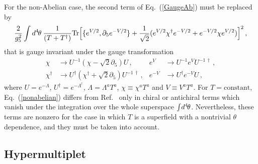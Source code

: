 \documentclass[a4paper,12pt]{article}
\begin{document}
For the non-Abelian case, the second term of Eq.~(\ref{GaugeAb}) must be
replaced by
\begin{equation}
   \frac{2}{g^2_5} \int d^4\mspace{-2mu}\theta\: 
\frac{1}{(T+ T^{\dag})} {\rm Tr} \Bigl[
        \{e^{V/2}, \partial_5 e^{-V/2}\} + \frac{1}{\sqrt{2}} (e^{V/2}
        \chi^{\dag} e^{-V/2} + e^{-V/2} \chi e^{V/2}) \Bigr]^2\, ,
\label{nonabelian}
\end{equation}
that is gauge invariant under the gauge transformation
\begin{align}
    \chi & \rightarrow U^{-1} (\chi - \sqrt{2} \partial_5) U\, , & e^{V} &
    \rightarrow U^{-1}e^{V} U^{-1\, \dagger}\, , \\
    \chi^{\dag} & \rightarrow U^\dagger (\chi^{\dag} + \sqrt{2} \partial_5)
    U^{-1\, \dagger}\, ,& e^{-V} & \rightarrow U^\dagger e^{-V} U\, ,
\label{nona}
\end{align}
where $U = e^{-\Lambda}$, $U^\dagger = e^{-{\Lambda}^{\dag}}$,
$\Lambda=\Lambda^{a}T^{a}$, $\chi \equiv \chi^{a}T^{a}$ and $V\equiv V^{a}
T^{a}$.  For $T=\text{constant}$, Eq.~(\ref{nonabelian})   differs from 
Ref.~\cite{agw} only
in chiral or antichiral terms which vanish under the integration over
the whole superspace $\int\! d^4\mspace{-2mu}\theta$.  Nevertheless, these
terms are nonzero for the case in which $T$ is a superfield with a
nontrivial $\theta$ dependence, and they must be taken into account.

\subsection{Hypermultiplet}
\end{document}
